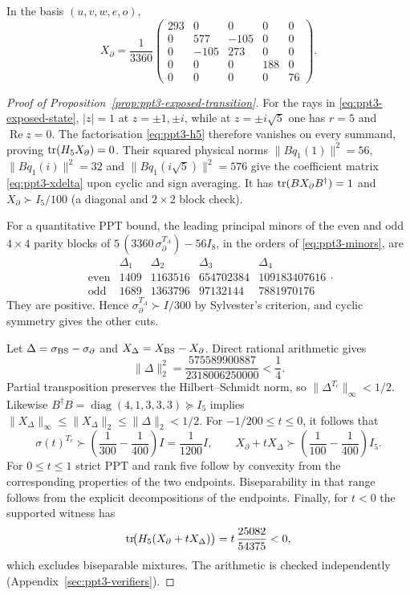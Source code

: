 In the basis $(u,v,w,e,o)$,
\begin{equation}\label{eq:ppt3-xdelta}
 X_\partial=\frac1{3360}
 \begin{pmatrix}
 293&0&0&0&0\\
 0&577&-105&0&0\\
 0&-105&273&0&0\\
 0&0&0&188&0\\
 0&0&0&0&76
 \end{pmatrix}.
\end{equation}

\begin{proof}[Proof of Proposition~\ref{prop:ppt3-exposed-transition}]
For the rays in \eqref{eq:ppt3-exposed-state},
$|z|=1$ at $z=\pm1,\pm i$, while at
$z=\pm i\sqrt5$ one has $r=5$ and
$\operatorname{Re}z=0$. The factorisation
\eqref{eq:ppt3-h5} therefore vanishes on every
summand, proving $\operatorname{tr}(H_5X_\partial)=0$.
Their squared physical norms
$\|Bq_1(1)\|^2=56$, $\|Bq_1(i)\|^2=32$
and $\|Bq_1(i\sqrt5)\|^2=576$ give the
coefficient matrix \eqref{eq:ppt3-xdelta} upon
cyclic and sign averaging. It has
$\operatorname{tr}(BX_\partial B^\dagger)=1$ and
$X_\partial\succ I_5/100$ (a diagonal and
$2\times2$ block check).

For a quantitative PPT bound, the leading
principal minors of the even and odd
$4\times4$ parity blocks of
$5\,(3360\,\sigma_\partial^{T_A})-56I_8$,
in the orders of \eqref{eq:ppt3-minors}, are
\[
\begin{array}{c|rrrr}
 &\Delta_1&\Delta_2&\Delta_3&\Delta_4\\\hline
\mathrm{even}&1409&1163516&654702384&109183407616\\
\mathrm{odd}&1689&1363796&97132144&7881970176
\end{array}.
\]
They are positive. Hence
$\sigma_\partial^{T_A}\succ I/300$ by
Sylvester's criterion, and cyclic symmetry
gives the other cuts.

Let $\Delta=\sigma_{\rm BS}-\sigma_\partial$
and $X_\Delta=X_{\rm BS}-X_\partial$.
Direct rational arithmetic gives
\[
 \|\Delta\|_2^2=
 \frac{575589900887}{2318006250000}<\frac14 .
\]
Partial transposition preserves the
Hilbert--Schmidt norm, so
$\|\Delta^{T_c}\|_\infty<1/2$.
Likewise $B^\dagger B=\operatorname{diag}(4,1,3,3,3)
\succeq I_5$ implies
$\|X_\Delta\|_\infty\le\|X_\Delta\|_2
\le\|\Delta\|_2<1/2$.
For $-1/200\le t\le0$, it follows that
\[
 \sigma(t)^{T_c}\succ
   \left(\frac1{300}-\frac1{400}\right)I
      =\frac1{1200}I,\qquad
 X_\partial+tX_\Delta\succ
   \left(\frac1{100}-\frac1{400}\right)I_5 .
\]
For $0\le t\le1$ strict PPT and rank five
follow by convexity from the corresponding
properties of the two endpoints. Biseparability in that range follows from the explicit decompositions of the endpoints.
Finally, for $t<0$ the supported witness has
\[
 \operatorname{tr}\!\bigl(H_5(X_\partial+tX_\Delta)\bigr)
 =t\,\frac{25082}{54375}<0,
\]
which excludes biseparable mixtures.
The arithmetic is checked independently (Appendix~\ref{sec:ppt3-verifiers}).
\end{proof}

